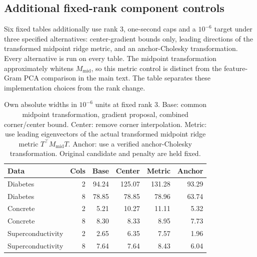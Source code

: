 \subsection{Additional fixed-rank component controls}
Six fixed tables additionally use rank 3, one-second caps and a $10^{-6}$ target under three specified alternatives: center-gradient bounds only, leading directions of the transformed midpoint ridge metric, and an anchor-Cholesky transformation. Every alternative is run on every table. The midpoint transformation approximately whitens $M_{\mathrm{mid}}$, so this metric control is distinct from the feature-Gram PCA comparison in the main text. The table separates these implementation choices from the rank change.
\begin{table}[t]\caption{Own absolute widths in $10^{-6}$ units at fixed rank 3. Base: common midpoint transformation, gradient proposal, combined corner/center bound. Center: remove corner interpolation. Metric: use leading eigenvectors of the actual transformed midpoint ridge metric $T^\top M_{\mathrm{mid}}T$. Anchor: use a verified anchor-Cholesky transformation. Original candidate and penalty are held fixed.}\centering\small\begin{tabular}{lrrrrr}\toprule Data&Cols&Base&Center&Metric&Anchor\\\midrule
Diabetes&2&94.24&125.07&131.28&93.29\\
Diabetes&8&78.85&78.85&78.96&63.74\\
Concrete&2&5.21&10.27&11.11&5.32\\
Concrete&8&8.30&8.33&8.95&7.73\\
Superconductivity&2&2.65&6.35&7.57&1.96\\
Superconductivity&8&7.64&7.64&8.43&6.04\\\bottomrule\end{tabular}\end{table}
